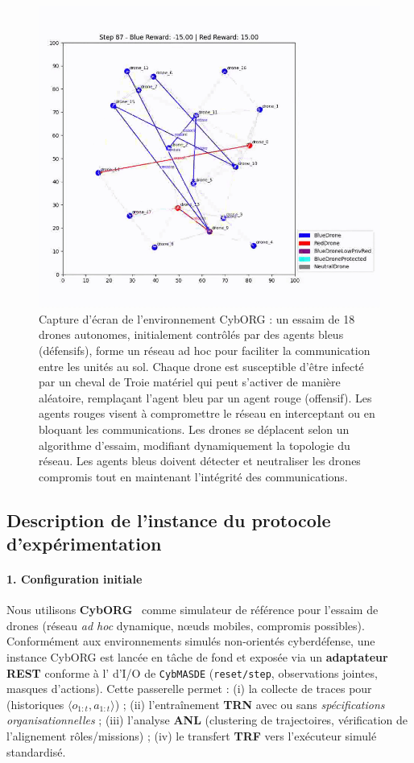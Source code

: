 \begin{figure}[h!]
  \centering
  \includegraphics[trim=0cm 1cm 0cm 1cm, clip, width=0.6\linewidth]{figures/cyborg.png}
  \caption[Capture d'écran de l'environnement CybORG]{Capture d'écran de l'environnement CybORG : un essaim de 18 drones autonomes, initialement contrôlés par des agents bleus (défensifs), forme un réseau ad hoc pour faciliter la communication entre les unités au sol. Chaque drone est susceptible d'être infecté par un cheval de Troie matériel qui peut s'activer de manière aléatoire, remplaçant l'agent bleu par un agent rouge (offensif). Les agents rouges visent à compromettre le réseau en interceptant ou en bloquant les communications. Les drones se déplacent selon un algorithme d'essaim, modifiant dynamiquement la topologie du réseau. Les agents bleus doivent détecter et neutraliser les drones compromis tout en maintenant l'intégrité des communications.}
  \label{fig:cyborg}
\end{figure}

\subsection{Description de l'instance du protocole d'expérimentation}

\paragraph{1. Configuration initiale}

Nous utilisons \textbf{CybORG}~\cite{Standen2021} comme simulateur de référence pour l'essaim de drones (réseau \textit{ad hoc} dynamique, nœuds mobiles, compromis possibles). Conformément aux environnements simulés non-orientés cyberdéfense, une instance CybORG est lancée en tâche de fond et exposée via un \textbf{adaptateur REST} conforme à l’ d’I/O de \texttt{CybMASDE} (\texttt{reset/step}, observations jointes, masques d’actions). Cette passerelle permet : (i) la collecte de traces pour \texttt{} (historiques $\langle o_{1:t}, a_{1:t} \rangle$) ; (ii) l’entraînement  \textbf{TRN} avec ou sans \textit{spécifications organisationnelles} ; (iii) l’analyse \textbf{ANL} (clustering de trajectoires, vérification de l’alignement rôles/missions) ; (iv) le transfert \textbf{TRF} vers l’exécuteur simulé standardisé.

